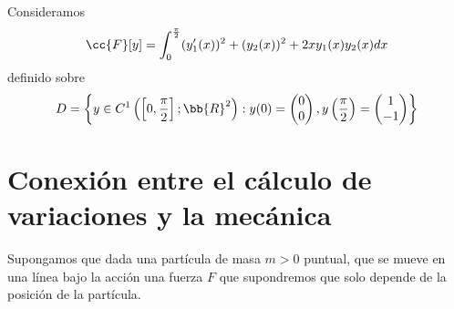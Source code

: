 \begin{ejemplo}
    Consideramos 
    \begin{gather*}
        \cc{F}[y] = \int_{0}^{\frac{\pi}{2}} (y_1'(x))^2 + (y_2(x))^2 + 2xy_1(x)y_2(x) dx
    \end{gather*}
    definido sobre
    \begin{gather*}
        D = \left\{y\in C^1\left(\left[0,\frac{\pi}{2}\right];\bb{R}^2\right) : y(0) = 
        \begin{pmatrix}
            0\\ 0
        \end{pmatrix}
        , y\left(\frac{\pi}{2}\right) = 
        \begin{pmatrix}
            1 \\ -1
        \end{pmatrix}
        \right\}
    \end{gather*} 
\end{ejemplo}

\section{Conexión entre el cálculo de variaciones y la mecánica}

Supongamos que dada una partícula de masa $m>0$ puntual, que se mueve en una línea bajo la acción una fuerza $F$ que supondremos que solo depende de la posición de la partícula.\\

